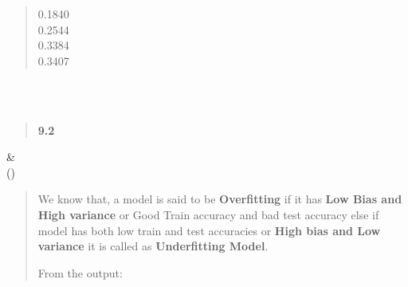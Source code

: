\documentclass[
]{article}
\begin{document}
\begin{longtable}[]
\begin{minipage}[t]{\linewidth}
\begin{quote}
0.1840\\
0.2544\\
0.3384\\
0.3407
\end{quote}\strut
\end{minipage} \\
 \\
\begin{minipage}[t]{\linewidth}\raggedright
\begin{quote}
\textbf{9.2}
\end{quote}
\end{minipage} &
 \\
\bottomrule()
\end{longtable}

\begin{quote}
We know that, a model is said to be \textbf{Overfitting} if it has
\textbf{Low Bias and High variance} or Good Train accuracy and bad test
accuracy else if model has both low train and test accuracies or
\textbf{High bias and Low variance} it is called as \textbf{Underfitting
Model}.

From the output:
\end{quote}
\end{document}
